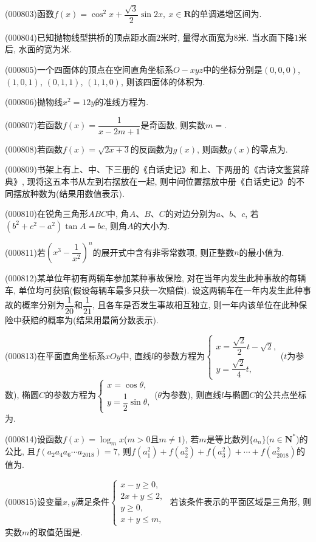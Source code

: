 \item (000803)函数$f(x)=\cos^2 x+\dfrac{\sqrt3}2\sin 2x,\ x\in \mathbf{R}$的单调递增区间为.
\item (000804)已知抛物线型拱桥的顶点距水面$2$米时, 量得水面宽为$8$米. 当水面下降$1$米后, 水面的宽为米.
\item (000805)一个四面体的顶点在空间直角坐标系$O-xyz$中的坐标分别是$(0,0,0)$, $(1,0,1)$, $(0,1,1)$, $(1,1,0)$, 则该四面体的体积为.
\item (000806)抛物线$x^2=12y$的准线方程为.
\item (000807)若函数$f(x)=\dfrac1{x-2m+1}$是奇函数, 则实数$m=$.
\item (000808)若函数$f(x)=\sqrt{2x+3}$的反函数为$g(x)$, 则函数$g(x)$的零点为.
\item (000809)书架上有上、中、下三册的《白话史记》和上、下两册的《古诗文鉴赏辞典》, 现将这五本书从左到右摆放在一起, 则中间位置摆放中册《白话史记》的不同摆放种数为(结果用数值表示).
\item (000810)在锐角三角形$ABC$中, 角$A$、$B$、$C$的对边分别为$a$、$b$、$c$, 若$(b^2+c^2-a^2)\tan A=bc$, 则角$A$的大小为.
\item (000811)若$(x^3-\dfrac1{x^2})^n$的展开式中含有非零常数项, 则正整数$n$的最小值为.
\item (000812)某单位年初有两辆车参加某种事故保险, 对在当年内发生此种事故的每辆车, 单位均可获赔(假设每辆车最多只获一次赔偿). 设这两辆车在一年内发生此种事故的概率分别为$\dfrac1{20}$和$\dfrac1{21}$, 且各车是否发生事故相互独立, 则一年内该单位在此种保险中获赔的概率为(结果用最简分数表示).
\item (000813)在平面直角坐标系$xOy$中, 直线$l$的参数方程为$\begin{cases} x=\dfrac{\sqrt2}2t-\sqrt2, \\ y=\dfrac{\sqrt2}4t, \end{cases}$($t$为参数), 椭圆$C$的参数方程为$\begin{cases} x=\cos \theta,  \\ y=\dfrac12\sin \theta,  \end{cases}$($\theta$为参数), 则直线$l$与椭圆$C$的公共点坐标为.
\item (000814)设函数$f(x)=\log_m x$($m>0$且$m\ne 1$), 若$m$是等比数列$\{a_n\}$($n\in \mathbf{N}^*$)的公比, 且$f(a_2a_4a_6\cdots a_{2018})=7$, 则$f(a_1^2)+f(a_2^2)+f(a_3^2)+\cdots+f(a_{2018}^2)$的值为.
\item (000815)设变量$x,y$满足条件$\begin{cases}  x-y\ge 0, \\ 2x+y\le 2, \\ y\ge 0, \\ x+y\le m, \end{cases}$ 若该条件表示的平面区域是三角形, 则实数$m$的取值范围是.
